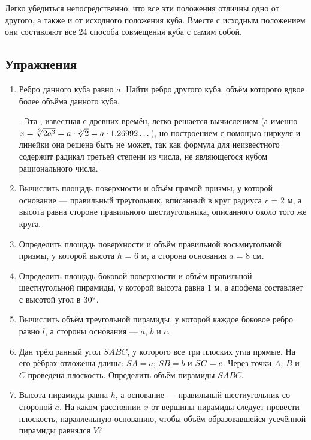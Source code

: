 Легко убедиться непосредственно, что все эти положения отличны одно от другого, а также и от исходного положения куба.
Вместе с исходным положением они составляют все 24 способа совмещения куба с самим собой.


\subsection*{Упражнения}

\begin{enumerate}

\item
Ребро данного куба равно $a$.
Найти ребро другого куба, объём которого вдвое более объёма данного куба.

\medskip

.
Эта , известная с древних времён, легко решается вычислением (а именно $x=\sqrt[3]{2a^3}=a\cdot\sqrt[3]{2}\z=a\cdot1{,}26992 \dots $), но построением с помощью циркуля и линейки она решена быть не может, так как формула для неизвестного содержит радикал третьей степени из числа, не являющегося кубом рационального числа.

\item
Вычислить площадь поверхности и объём прямой призмы, у которой основание — правильный треугольник, вписанный в круг радиуса $r$ = 2 м, а высота равна стороне правильного шестиугольника, описанного около того же круга.

\item
Определить площадь поверхности и объём правильной восьмиугольной призмы, у которой высота $h$ = 6 м, а сторона основания $a$ = 8 см.

\item
Определить площадь боковой поверхности и объём правильной шестиугольной пирамиды, у которой высота равна 1 м, а апофема составляет с высотой угол в $30\degree$.

\item
Вычислить объём треугольной пирамиды, у которой каждое боковое ребро равно $l$, а стороны основания — $a$, $b$ и $c$.

\item
Дан трёхгранный угол $SABC$, у которого все три плоских угла прямые.
На его рёбрах отложены длины: $SA = a$;
$SB = b$ и $SC\z=c$.
Через точки $A$, $B$ и $C$ проведена плоскость.
Определить объём пирамиды $SABC$.

\item
Высота пирамиды равна $h$, а основание — правильный шестиугольник со стороной $a$.
На каком расстоянии $x$ от вершины пирамиды следует провести плоскость, параллельную основанию, чтобы объём образовавшейся усечённой пирамиды равнялся $V$?


\end{enumerate}
